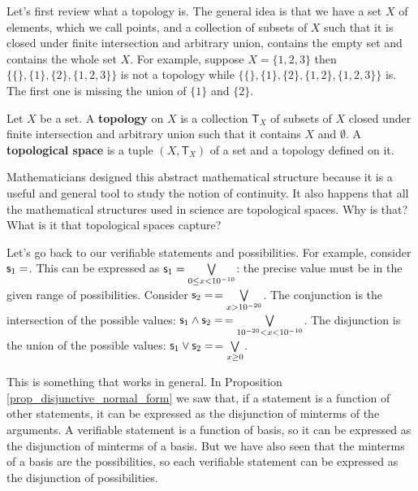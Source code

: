 \documentclass[11pt,letterpaper,fleqn]{memoir} %
\begin{document}
Let's first review what a topology is. The general idea is that we have a set $X$ of elements, which we call points, and a collection of subsets of $X$ such that it is closed under finite intersection and arbitrary union, contains the empty set and contains the whole set $X$. For example, suppose $X=\{1,2,3\}$ then $\{\{\}, \{1\}, \{2\},\{1,2,3\}\}$ is not a topology while $\{\{\}, \{1\}, \{2\},\{1,2\},\{1,2,3\}\}$ is. The first one is missing the union of $\{1\}$ and $\{2\}$.

\begin{mathSection}
	\begin{defn}
		Let $X$ be a set. A \textbf{topology} on $X$ is a collection $\mathsf{T}_X$ of subsets of $X$ closed under finite intersection and arbitrary union such that it contains $X$ and $\emptyset$. A \textbf{topological space} is a tuple $(X, \mathsf{T}_X)$ of a set and a topology defined on it.
	\end{defn}
\end{mathSection}

Mathematicians designed this abstract mathematical structure because it is a useful and general tool to study the notion of continuity. It also happens that all the mathematical structures used in science are topological spaces. Why is that? What is it that topological spaces capture?

Let's go back to our verifiable statements and possibilities. For example, consider $\mathsf{s}_1=$. This can be expressed as $\mathsf{s}_1=\bigvee\limits_{0\leq x<10^{-10}}$: the precise value must be in the given range of possibilities. Consider $\mathsf{s}_2=$$=\bigvee\limits_{x>10^{-20}}$. The conjunction is the intersection of the possible values: $\mathsf{s}_1\wedge\mathsf{s}_2=$$=\bigvee\limits_{10^{-20}< x<10^{-10}}$. The disjunction is the union of the possible values: $\mathsf{s}_1\vee\mathsf{s}_2=$$=\bigvee\limits_{x\geq0}$.

This is something that works in general. In Proposition \ref{prop_disjunctive_normal_form} we saw that, if a statement is a function of other statements, it can be expressed as the disjunction of minterms of the arguments. A verifiable statement is a function of basis, so it can be expressed as the disjunction of minterms of a basis. But we have also seen that the minterms of a basis are the possibilities, so each verifiable statement can be expressed as the disjunction of possibilities.
\end{document}
